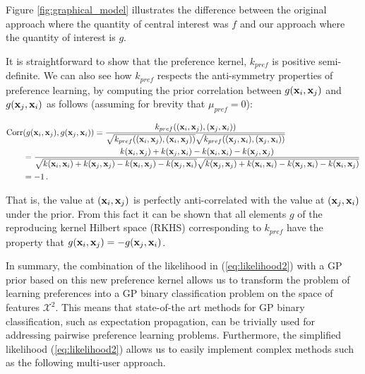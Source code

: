 Figure \ref{fig:graphical_model} illustrates the difference between the original approach where the quantity of central interest was $f$ and our approach where the quantity of interest is $g$.



It is straightforward to show that the preference kernel, $k_{pref}$ is positive semi-definite. We can also see how $k_{pref}$ respects the anti-symmetry properties of preference learning, by computing the prior correlation between $g(\mathbf{x}_i,\mathbf{x}_j)$ and $g(\mathbf{x}_j,\mathbf{x}_i)$ as follows (assuming for brevity that $\mu_{pref}=0$):
 
 \begin{align}
 	\text{Corr}&(g(\mathbf{x}_i,\mathbf{x}_j),g(\mathbf{x}_j,\mathbf{x}_i)) = \frac{k_{pref}((\mathbf{x}_i,\mathbf{x}_j),(\mathbf{x}_j,\mathbf{x}_i))}{\sqrt{k_{pref}((\mathbf{x}_i,\mathbf{x}_j),(\mathbf{x}_i,\mathbf{x}_j))}\sqrt{k_{pref}((\mathbf{x}_j,\mathbf{x}_i),(\mathbf{x}_j,\mathbf{x}_i))}} \notag\\
 		&= \frac{k(\mathbf{x}_i,\mathbf{x}_j) + k(\mathbf{x}_j,\mathbf{x}_i) - k(\mathbf{x}_i,\mathbf{x}_i) - k(\mathbf{x}_j,\mathbf{x}_j)}{\sqrt{k(\mathbf{x}_i,\mathbf{x}_i) + k(\mathbf{x}_j,\mathbf{x}_j) - k(\mathbf{x}_i,\mathbf{x}_j) - k(\mathbf{x}_j,\mathbf{x}_i)}\sqrt{k(\mathbf{x}_j,\mathbf{x}_j) + k(\mathbf{x}_i,\mathbf{x}_i) - k(\mathbf{x}_j,\mathbf{x}_i) - k(\mathbf{x}_i,\mathbf{x}_j)}}\notag\\ &= -1\,.\notag
 \end{align}

That is, the value at $(\mathbf{x}_i,\mathbf{x}_j)$ is perfectly anti-correlated with the value at $(\mathbf{x}_j,\mathbf{x}_i)$ under the prior. From this fact it can be shown that all elements $g$ of the reproducing kernel Hilbert space (RKHS) corresponding to $k_{pref}$ have the property that $g(\mathbf{x}_i,\mathbf{x}_j) = -g(\mathbf{x}_j,\mathbf{x}_i)$. 

In summary, the combination of the likelihood in (\ref{eq:likelihood2})
with a GP prior based on this new preference kernel allows us
to transform the problem of learning preferences into a
GP binary classification problem on the space of features
$\mathcal{X}^2$. 
This means that state-of-the art methods
for GP binary classification, such as expectation propagation,
can be trivially used for addressing pairwise preference learning problems.
Furthermore, the simplified likelihood (\ref{eq:likelihood2})
allows us to easily implement complex methods 
such as the following multi-user approach.



